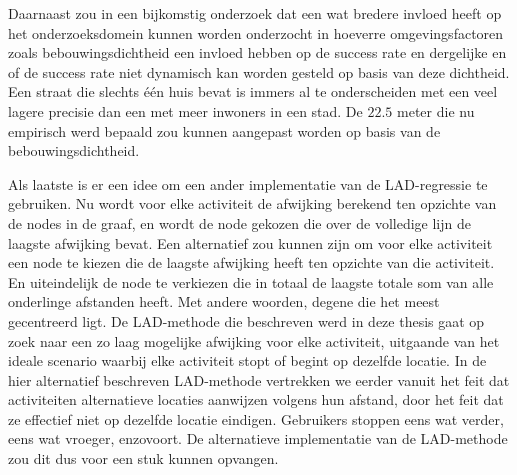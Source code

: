 Daarnaast zou in een bijkomstig onderzoek dat een wat bredere invloed heeft op
het onderzoeksdomein kunnen worden onderzocht in hoeverre omgevingsfactoren
zoals bebouwingsdichtheid een invloed hebben op de success rate en dergelijke
en of de success rate niet dynamisch kan worden gesteld op basis van deze
dichtheid. Een straat die slechts één huis bevat is immers al te onderscheiden
met een veel lagere precisie dan een met meer inwoners in een stad. De $22.5$
meter die nu empirisch werd bepaald zou kunnen aangepast worden op basis van de
bebouwingsdichtheid.

Als laatste is er een idee om een ander implementatie van de \ac{LAD}-regressie
te gebruiken. Nu wordt voor elke activiteit de afwijking berekend ten opzichte
van de nodes in de graaf, en wordt de node gekozen die over de volledige lijn
de laagste afwijking bevat. Een alternatief zou kunnen zijn om voor elke
activiteit een node te kiezen die de laagste afwijking heeft ten opzichte van
die activiteit. En uiteindelijk de node te verkiezen die in totaal de laagste
totale som van alle onderlinge afstanden heeft. Met andere woorden, degene die
het meest gecentreerd ligt. De \ac{LAD}-methode die beschreven werd in deze
thesis gaat op zoek naar een zo laag mogelijke afwijking voor elke activiteit,
uitgaande van het ideale scenario waarbij elke activiteit stopt of begint op
dezelfde locatie. In de hier alternatief beschreven \ac{LAD}-methode vertrekken
we eerder vanuit het feit dat activiteiten alternatieve locaties aanwijzen
volgens hun afstand, door het feit dat ze effectief niet op dezelfde locatie
eindigen. Gebruikers stoppen eens wat verder, eens wat vroeger, enzovoort. De
alternatieve implementatie van de \ac{LAD}-methode zou dit dus voor een stuk
kunnen opvangen.



